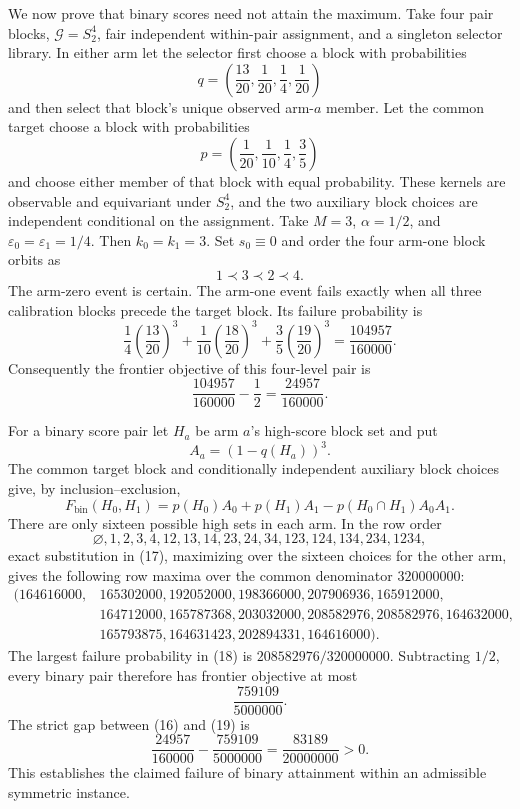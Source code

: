 We now prove that binary scores need not attain the maximum. Take four pair blocks, \(\mathcal G=S_2^4\), fair independent within-pair assignment, and a singleton selector library. In either arm let the selector first choose a block with probabilities
\[
q=\left(\frac{13}{20},\frac1{20},\frac14,\frac1{20}\right)
\tag{13}
\]
and then select that block's unique observed arm-\(a\) member. Let the common target choose a block with probabilities
\[
p=\left(\frac1{20},\frac1{10},\frac14,\frac35\right)
\tag{14}
\]
and choose either member of that block with equal probability. These kernels are observable and equivariant under \(S_2^4\), and the two auxiliary block choices are independent conditional on the assignment. Take \(M=3\), \(\alpha=1/2\), and \(\varepsilon_0=\varepsilon_1=1/4\). Then \(k_0=k_1=3\). Set \(s_0\equiv0\) and order the four arm-one block orbits as
\[
1\prec3\prec2\prec4.
\]
The arm-zero event is certain. The arm-one event fails exactly when all three calibration blocks precede the target block. Its failure probability is
\[
\frac14\left(\frac{13}{20}\right)^3
+\frac1{10}\left(\frac{18}{20}\right)^3
+\frac35\left(\frac{19}{20}\right)^3
=\frac{104957}{160000}.
\tag{15}
\]
Consequently the frontier objective of this four-level pair is
\[
\frac{104957}{160000}-\frac12
=\frac{24957}{160000}.
\tag{16}
\]

For a binary score pair let \(H_a\) be arm \(a\)'s high-score block set and put
\[
A_a=(1-q(H_a))^3.
\]
The common target block and conditionally independent auxiliary block choices give, by inclusion--exclusion,
\[
F_{\mathrm{bin}}(H_0,H_1)
=p(H_0)A_0+p(H_1)A_1-p(H_0\cap H_1)A_0A_1.
\tag{17}
\]
There are only sixteen possible high sets in each arm. In the row order
\[
\varnothing,1,2,3,4,12,13,14,23,24,34,123,124,134,234,1234,
\]
exact substitution in (17), maximizing over the sixteen choices for the other arm, gives the following row maxima over the common denominator \(320000000\):
\[
\begin{split}
(164616000,&165302000,192052000,198366000,207906936,165912000,\\
&164712000,165787368,203032000,208582976,208582976,164632000,\\
&165793875,164631423,202894331,164616000).
\end{split}
\tag{18}
\]
The largest failure probability in (18) is \(208582976/320000000\). Subtracting \(1/2\), every binary pair therefore has frontier objective at most
\[
\frac{759109}{5000000}.
\tag{19}
\]
The strict gap between (16) and (19) is
\[
\frac{24957}{160000}-\frac{759109}{5000000}
=\frac{83189}{20000000}>0.
\tag{20}
\]
This establishes the claimed failure of binary attainment within an admissible symmetric instance.

